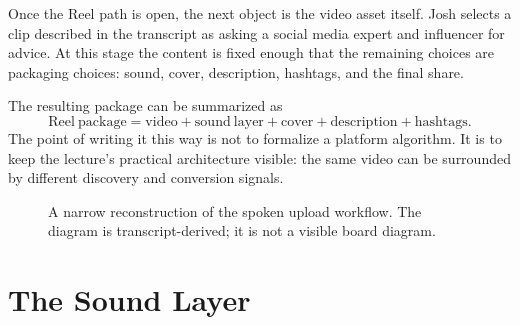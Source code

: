 Once the Reel path is open, the next object is the video asset itself. Josh selects a clip described in the transcript as asking a social media expert and influencer for advice. At this stage the content is fixed enough that the remaining choices are packaging choices: sound, cover, description, hashtags, and the final share.

The resulting package can be summarized as
\begin{equation}
\mathrm{Reel\ package}
=
\mathrm{video}
+
\mathrm{sound\ layer}
+
\mathrm{cover}
+
\mathrm{description}
+
\mathrm{hashtags}.
\end{equation}
The point of writing it this way is not to formalize a platform algorithm. It is to keep the lecture's practical architecture visible: the same video can be surrounded by different discovery and conversion signals.

\begin{figure}
\centering
{}
\caption{A narrow reconstruction of the spoken upload workflow. The diagram is transcript-derived; it is not a visible board diagram.}
\end{figure}

\section{The Sound Layer}

